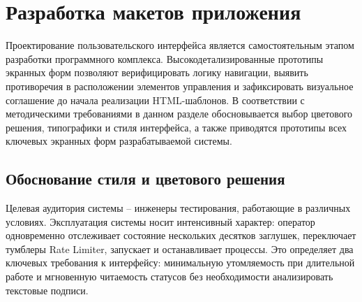 


\section{Разработка макетов приложения}

Проектирование пользовательского интерфейса является самостоятельным этапом разработки программного комплекса. Высокодетализированные прототипы экранных форм позволяют верифицировать логику навигации, выявить противоречия в расположении элементов управления и зафиксировать визуальное соглашение до начала реализации HTML-шаблонов. В соответствии с методическими требованиями в данном разделе обосновывается выбор цветового решения, типографики и стиля интерфейса, а также приводятся прототипы всех ключевых экранных форм разрабатываемой системы.

\subsection{Обоснование стиля и цветового решения}

Целевая аудитория системы -- инженеры тестирования, работающие в различных условиях. Эксплуатация системы носит интенсивный характер: оператор одновременно отслеживает состояние нескольких десятков заглушек, переключает тумблеры Rate Limiter, запускает и останавливает процессы. Это определяет два ключевых требования к интерфейсу: минимальную утомляемость при длительной работе и мгновенную читаемость статусов без необходимости анализировать текстовые подписи.

